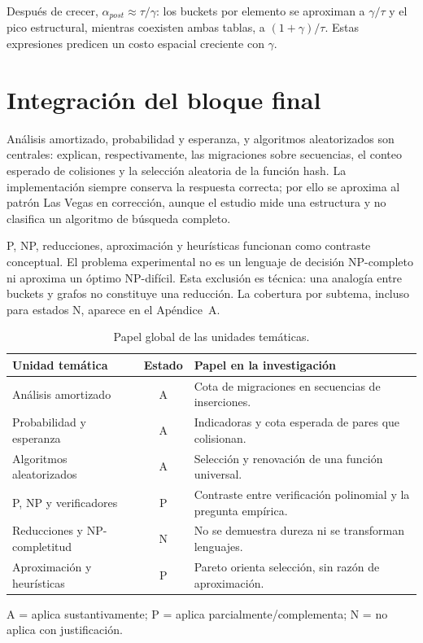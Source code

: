 \documentclass[11pt]{article}
\begin{document}
Después de crecer, $\alpha_{post}\approx\tau/\gamma$: los buckets por elemento se aproximan a $\gamma/\tau$ y el pico estructural, mientras coexisten ambas tablas, a $(1+\gamma)/\tau$. Estas expresiones predicen un costo espacial creciente con $\gamma$.

\section{Integración del bloque final}
Análisis amortizado, probabilidad y esperanza, y algoritmos aleatorizados son centrales: explican, respectivamente, las migraciones sobre secuencias, el conteo esperado de colisiones y la selección aleatoria de la función hash. La implementación siempre conserva la respuesta correcta; por ello se aproxima al patrón Las Vegas en corrección, aunque el estudio mide una estructura y no clasifica un algoritmo de búsqueda completo.

P, NP, reducciones, aproximación y heurísticas funcionan como contraste conceptual. El problema experimental no es un lenguaje de decisión NP-completo ni aproxima un óptimo NP-difícil. Esta exclusión es técnica: una analogía entre buckets y grafos no constituye una reducción. La cobertura por subtema, incluso para estados N, aparece en el Apéndice~A.

\begin{table}[H]
\centering\small
\caption{Papel global de las unidades temáticas.}
\begin{tabularx}{\linewidth}{p{3.6cm}c X}
\toprule Unidad temática & Estado & Papel en la investigación \\
\midrule
Análisis amortizado & A & Cota de migraciones en secuencias de inserciones.\\
Probabilidad y esperanza & A & Indicadoras y cota esperada de pares que colisionan.\\
Algoritmos aleatorizados & A & Selección y renovación de una función universal.\\
P, NP y verificadores & P & Contraste entre verificación polinomial y la pregunta empírica.\\
Reducciones y NP-completitud & N & No se demuestra dureza ni se transforman lenguajes.\\
Aproximación y heurísticas & P & Pareto orienta selección, sin razón de aproximación.\\
\bottomrule
\end{tabularx}
\end{table}
\noindent\footnotesize A = aplica sustantivamente; P = aplica parcialmente/complementa; N = no aplica con justificación.\normalsize
\end{document}
